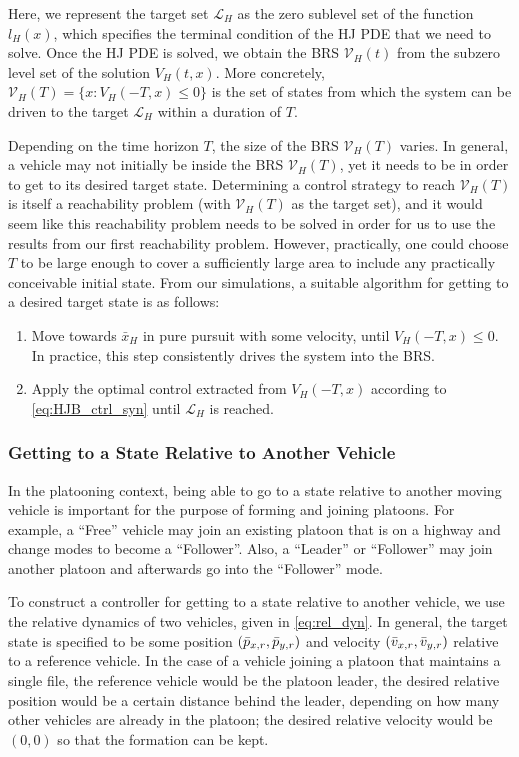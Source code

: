 Here, we represent the target set $\mathcal{L}_H$ as the zero sublevel set of the function $l_H(x)$, which specifies the terminal condition of the HJ PDE that we need to solve. Once the HJ PDE is solved, we obtain the BRS $\mathcal V_H(t)$ from the subzero level set of the solution $V_H(t,x)$. More concretely, $\mathcal{V}_H(T) = \{x: V_H(-T,x)\le 0\}$ is the set of states from which the system can be driven to the target $\mathcal{L}_H$ within a duration of $T$. 

Depending on the time horizon $T$, the size of the BRS $\mathcal V_H(T)$ varies. In general, a vehicle may not initially be inside the BRS $\mathcal V_H(T)$, yet it needs to be in order to get to its desired target state. Determining a control strategy to reach $\mathcal V_H(T)$ is itself a reachability problem (with $\mathcal V_H(T)$ as the target set), and it would seem like this reachability problem needs to be solved in order for us to use the results from our first reachability problem. However, practically, one could choose $T$ to be large enough to cover a sufficiently large area to include any practically conceivable initial state. From our simulations, a suitable algorithm for getting to a desired target state is as follows:

\begin{enumerate}
\item Move towards $\bar{x}_H$ in pure pursuit with some velocity, until $V_H(-T,x)\le 0$. In practice, this step consistently drives the system into the BRS.
\item Apply the optimal control extracted from $V_H(-T,x)$ according to \eqref{eq:HJB_ctrl_syn} until $\mathcal{L}_H$ is reached.
\end{enumerate}

\subsubsection{Getting to a State Relative to Another Vehicle \label{sec:rel_target_ctrl}}
In the platooning context, being able to go to a state relative to another moving vehicle is important for the purpose of forming and joining platoons. For example, a ``Free'' vehicle may join an existing platoon that is on a highway and change modes to become a ``Follower''. Also, a ``Leader'' or ``Follower'' may join another platoon and afterwards go into the ``Follower'' mode.

To construct a controller for getting to a state relative to another vehicle, we use the relative dynamics of two vehicles, given in \eqref{eq:rel_dyn}. In general, the target state is specified to be some position $(\bar{p}_{x,r}, \bar{p}_{y,r})$ and velocity $(\bar{v}_{x,r}, \bar{v}_{y,r})$ relative to a reference vehicle. In the case of a vehicle joining a platoon that maintains a single file, the reference vehicle would be the platoon leader, the desired relative position would be a certain distance behind the leader, depending on how many other vehicles are already in the platoon; the desired relative velocity would be $(0,0)$ so that the formation can be kept.

